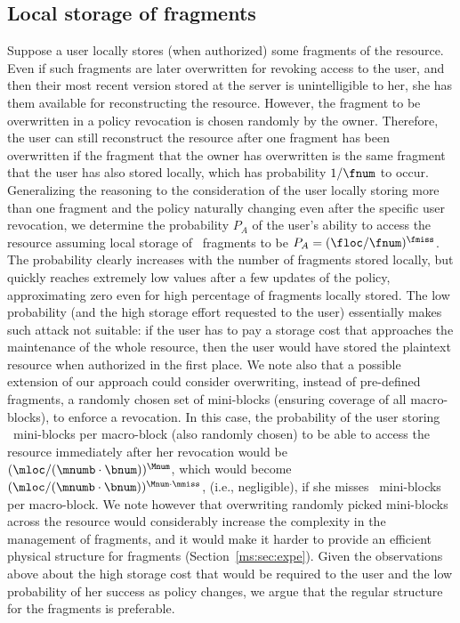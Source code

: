 \subsection{Local storage of fragments}
Suppose a user locally stores (when authorized) some fragments of the resource. Even if such fragments are later overwritten for revoking access to the user, and then their most recent version stored at the server is unintelligible to her, she has them available for reconstructing the resource. However, the fragment to be overwritten in a policy revocation is chosen randomly by the owner. Therefore, the user can still reconstruct the resource after one fragment has been overwritten if the fragment that the owner has overwritten is the same fragment that the user has also stored locally, which has probability ${1}/{\fnum}$ to occur. Generalizing the reasoning to the consideration of the user locally storing more than one fragment and the policy naturally changing even after the specific user revocation, we determine the probability $P_A$ of the user's ability to access the resource assuming local storage of \floc\ fragments to be $P_A=(\floc/\fnum)^{\fmiss}$. The probability clearly increases with the number of fragments stored locally, but quickly reaches extremely low values after a few updates of the policy, approximating zero even for high percentage of fragments locally stored. The low probability (and the high storage effort requested to the user) essentially makes such attack not suitable: if the user has to pay a storage cost that approaches the maintenance of the whole resource, then the user would have stored the plaintext resource when authorized in the first place. We note also that a possible extension of our approach could consider overwriting, instead of pre-defined fragments, a randomly chosen set of mini-blocks (ensuring coverage of all macro-blocks), to enforce a revocation. In this case, the probability of the user storing \mloc\ mini-blocks per macro-block (also randomly chosen) to be able to access the resource immediately after her revocation would be $(\mloc/(\mnumb\cdot\bnum))^{\Mnum}$, which would become $(\mloc/(\mnumb\cdot\bnum))^{\Mnum\cdot \mmiss}$, (i.e., negligible), if she misses \mmiss\ mini-blocks per macro-block. We note however that overwriting randomly picked mini-blocks across the resource would considerably increase the complexity in the management of fragments, and it would make it harder to provide an efficient physical structure for fragments (Section~\ref{ms:sec:expe}). Given the observations above about the high storage cost that would be required to the user and the low probability of her success as policy changes, we argue that the regular structure for the fragments is preferable.


